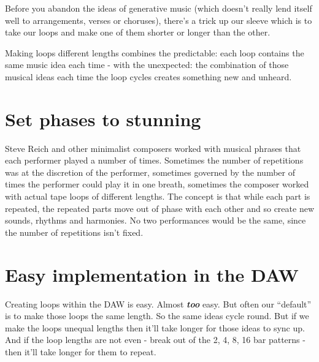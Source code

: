 \documentclass[
  12pt,
  letterpaper,
  oneside,
  open=any]{scrbook}
\begin{document}
Before you abandon the ideas of generative music (which doesn't really
lend itself well to arrangements, verses or choruses), there's a trick
up our sleeve which is to take our loops and make one of them shorter or
longer than the other.

\begin{tcolorbox}[enhanced jigsaw, toprule=.15mm, leftrule=.75mm, coltitle=black, bottomtitle=1mm, colbacktitle=quarto-callout-tip-color!10!white, bottomrule=.15mm, opacityback=0, colback=white, arc=.35mm, colframe=quarto-callout-tip-color-frame, opacitybacktitle=0.6, toptitle=1mm, titlerule=0mm, rightrule=.15mm, title=\textcolor{quarto-callout-tip-color}{\faLightbulb}\hspace{0.5em}{Key idea}, left=2mm, breakable]

Making loops different lengths combines the predictable: each loop
contains the same music idea each time - with the unexpected: the
combination of those musical ideas each time the loop cycles creates
something new and unheard.

\end{tcolorbox}

\section{Set phases to stunning}\label{set-phases-to-stunning}

Steve Reich and other minimalist composers worked with musical phrases
that each performer played a number of times. Sometimes the number of
repetitions was at the discretion of the performer, sometimes governed
by the number of times the performer could play it in one breath,
sometimes the composer worked with actual tape loops of different
lengths. The concept is that while each part is repeated, the repeated
parts move out of phase with each other and so create new sounds,
rhythms and harmonies. No two performances would be the same, since the
number of repetitions isn't fixed.

\section{Easy implementation in the
DAW}\label{easy-implementation-in-the-daw}

Creating loops within the DAW is easy. Almost \textbf{\emph{too}} easy.
But often our ``default'' is to make those loops the same length. So the
same ideas cycle round. But if we make the loops unequal lengths then
it'll take longer for those ideas to sync up. And if the loop lengths
are not even - break out of the 2, 4, 8, 16 bar patterns - then it'll
take longer for them to repeat.
\end{document}
